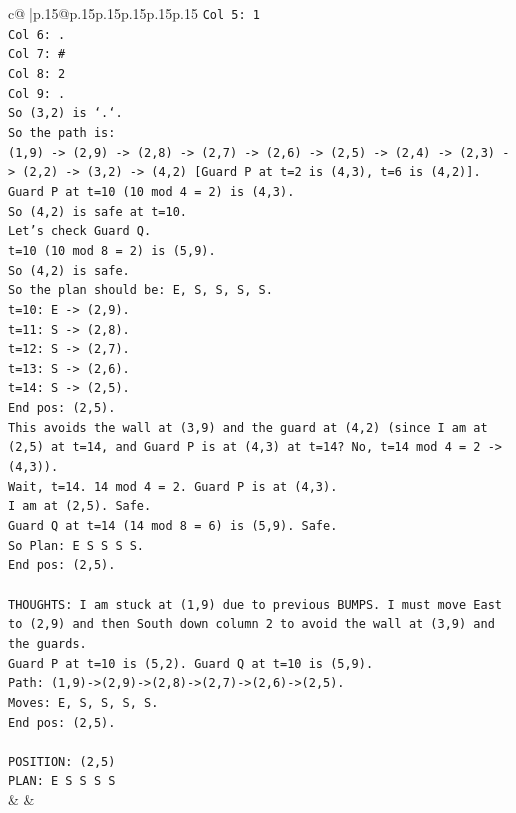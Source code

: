 \documentclass{article}
\begin{document}
{\begin{supertabular}{c@{$\;$}|p{.15\linewidth}@{}p{.15\linewidth}p{.15\linewidth}p{.15\linewidth}p{.15\linewidth}p{.15\linewidth}}
{{{\texttt{Col 5: 1} \\
\texttt{Col 6: .} \\
\texttt{Col 7: \#} \\
\texttt{Col 8: 2} \\
\texttt{Col 9: .} \\
\texttt{So (3,2) is `.`.} \\
\texttt{So the path is:} \\
\texttt{(1,9) {-}> (2,9) {-}> (2,8) {-}> (2,7) {-}> (2,6) {-}> (2,5) {-}> (2,4) {-}> (2,3) {-}> (2,2) {-}> (3,2) {-}> (4,2) {[}Guard P at t=2 is (4,3), t=6 is (4,2){]}.} \\
\texttt{Guard P at t=10 (10 mod 4 = 2) is (4,3).} \\
\texttt{So (4,2) is safe at t=10.} \\
\texttt{Let's check Guard Q.} \\
\texttt{t=10 (10 mod 8 = 2) is (5,9).} \\
\texttt{So (4,2) is safe.} \\
\texttt{So the plan should be: E, S, S, S, S.} \\
\texttt{t=10: E {-}> (2,9).} \\
\texttt{t=11: S {-}> (2,8).} \\
\texttt{t=12: S {-}> (2,7).} \\
\texttt{t=13: S {-}> (2,6).} \\
\texttt{t=14: S {-}> (2,5).} \\
\texttt{End pos: (2,5).} \\
\texttt{This avoids the wall at (3,9) and the guard at (4,2) (since I am at (2,5) at t=14, and Guard P is at (4,3) at t=14? No, t=14 mod 4 = 2 {-}> (4,3)).} \\
\texttt{Wait, t=14. 14 mod 4 = 2. Guard P is at (4,3).} \\
\texttt{I am at (2,5). Safe.} \\
\texttt{Guard Q at t=14 (14 mod 8 = 6) is (5,9). Safe.} \\
\texttt{So Plan: E S S S S.} \\
\texttt{End pos: (2,5).} \\
\\ 
\texttt{THOUGHTS: I am stuck at (1,9) due to previous BUMPS. I must move East to (2,9) and then South down column 2 to avoid the wall at (3,9) and the guards.} \\
\texttt{Guard P at t=10 is (5,2). Guard Q at t=10 is (5,9).} \\
\texttt{Path: (1,9){-}>(2,9){-}>(2,8){-}>(2,7){-}>(2,6){-}>(2,5).} \\
\texttt{Moves: E, S, S, S, S.} \\
\texttt{End pos: (2,5).} \\
\\ 
\texttt{POSITION: (2,5)} \\
\texttt{PLAN: E S S S S} \\
            }
        }
    }
    & & \\ \\


\end{supertabular}}
\end{document}
